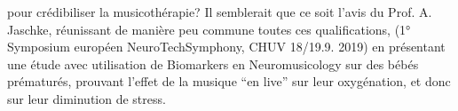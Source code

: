 pour crédibiliser la musicothérapie? Il semblerait que ce soit l'avis du Prof. A. Jaschke, réunissant de 
manière peu commune toutes ces qualifications, (1° Symposium européen 
NeuroTechSymphony, CHUV 18/19.9. 2019) en présentant une étude avec utilisation de
Biomarkers en Neuromusicology sur des
bébés prématurés, prouvant l'effet de la musique ``en live'' sur leur
oxygénation, et donc sur leur diminution de stress.  

